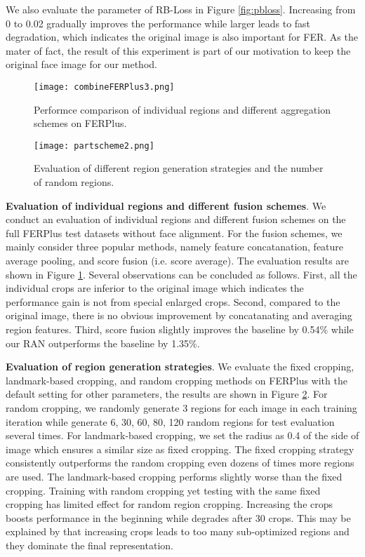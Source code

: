 \documentclass[journal]{IEEEtran}
\newcommand{\pxj}[1]{\textcolor[rgb]{0,0,0}{#1}}
\newcommand{\peng}[1]{\textcolor[rgb]{0,0,0}{#1}}
\begin{document}
We also evaluate the parameter  of RB-Loss in Figure \ref{fig:pbloss}. Increasing  from 0 to 0.02 gradually improves the performance while larger  leads to fast degradation, which indicates the original image is also important for FER. \pxj{As the mater of fact, the result of this experiment is part of our motivation to keep the original face image for our method.}






\begin{figure}[t]
\center
\texttt{[image: combineFERPlus3.png]}
\caption{\peng{Performce comparison of individual regions and different aggregation schemes on FERPlus.}}
\label{fig:combFERPlus}
\end{figure}

\begin{figure}[t]
    \centering
    \texttt{[image: partscheme2.png]}
    \caption{Evaluation of different region generation strategies and the number of random regions.}
    \label{fig:regionscheme}
\end{figure}




\textbf{Evaluation of individual regions and different fusion schemes}.
We conduct an evaluation of individual regions and different fusion schemes on the full FERPlus test datasets without face alignment. For the fusion schemes, we mainly consider three popular methods, namely feature concatanation, feature average pooling, and score fusion (i.e. score average). The evaluation results are shown in Figure \ref{fig:combFERPlus}. Several observations can be concluded as follows. First, all the individual crops are inferior to the original image which indicates the performance gain is not from special enlarged crops. Second, compared to the original image, there is no obvious improvement by concatanating and averaging region features. Third, score fusion slightly improves the baseline by 0.54\% while our RAN outperforms the baseline by 1.35\%.



\textbf{Evaluation of region generation strategies}.
We evaluate the fixed cropping, landmark-based cropping, and random cropping methods on FERPlus with the default setting for other parameters, the results are shown in Figure \ref{fig:regionscheme}. For random cropping, we randomly generate 3 regions for each image in each training iteration while generate 6, 30, 60, 80, 120 random regions for test evaluation several times. For landmark-based cropping, we set the radius as 0.4 of the side of image which ensures a similar size as fixed cropping. The fixed cropping strategy consistently outperforms the random cropping even dozens of times more regions are used. The landmark-based cropping performs slightly worse than the fixed cropping. Training with random cropping yet testing with the same fixed cropping has limited effect for random region cropping. Increasing the crops boosts performance in the beginning while degrades after 30 crops. This may be explained by that increasing crops leads to too many sub-optimized regions and they dominate the final representation. 
\end{document}
